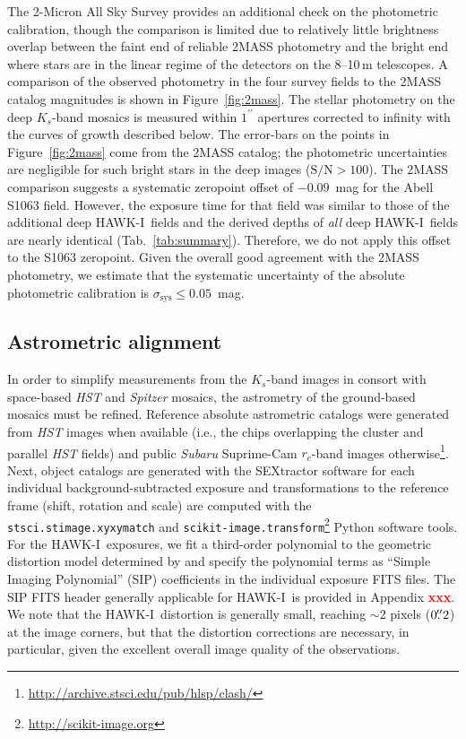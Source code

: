 \documentclass[preprint2]{aastex6}
\gdef\arcsec{^{\prime\prime}}
\newcommand\xxx{{\textcolor{red}{\bf xxx}}}
\gdef\HAWKI{\mbox{HAWK-I}}
\begin{document}
The 2-Micron All Sky Survey \citep[2MASS;][]{2mass} provides an additional check on the photometric calibration, though the comparison is limited due to relatively little brightness overlap between the faint end of reliable 2MASS photometry and the bright end where stars are in the linear regime of the detectors on the 8--10\,m telescopes.  A comparison of the observed photometry in the four survey fields to the 2MASS catalog magnitudes is shown in Figure~\ref{fig:2mass}.  The stellar photometry on the deep $K_s$-band mosaics is measured within $1\arcsec$ apertures corrected to infinity with the curves of growth described below.  The error-bars on the points in Figure~\ref{fig:2mass} come from the 2MASS catalog; the photometric uncertainties are negligible for such bright stars in the deep images ($\mathrm{S/N}>100$).  The 2MASS comparison suggests a systematic zeropoint offset of $-0.09$~mag for the Abell S1063 field.  However, the exposure time for that field was similar to those of the additional deep \HAWKI\ fields and the derived depths of \textit{all} deep \HAWKI\ fields are nearly identical (Tab.~\ref{tab:summary}).  Therefore, we do not apply this offset to the S1063 zeropoint.  Given the overall good agreement with the 2MASS photometry, we estimate that the systematic uncertainty of the absolute photometric calibration is $\sigma_\mathrm{sys}\leq0.05$~mag.

\subsection{Astrometric alignment}
\label{s:astrometry}

In order to simplify measurements from the $K_s$-band images in consort with space-based \textit{HST} and \textit{Spitzer} mosaics, the astrometry of the ground-based mosaics must be refined.  Reference absolute astrometric catalogs were generated from \textit{HST} images when available (i.e., the chips overlapping the cluster and parallel \textit{HST} fields) and public \textit{Subaru} Suprime-Cam $r_c$-band images otherwise\footnote{\url{http://archive.stsci.edu/pub/hlsp/clash/}}.  Next, object catalogs are generated with the SEXtractor software \citep{bertin:96} for each individual background-subtracted exposure and transformations to the reference frame (shift, rotation and scale) are computed with the \texttt{stsci.stimage.xyxymatch} and \texttt{scikit-image.transform}\footnote{\url{http://scikit-image.org}} Python software tools.  For the \HAWKI\ exposures, we fit a third-order polynomial to the geometric distortion model determined by \cite{libralato:14} and specify the polynomial terms as ``Simple Imaging Polynomial'' (SIP) coefficients \citep{fits:sip} in the individual exposure FITS files.  The SIP FITS header generally applicable for \HAWKI\ is provided in Appendix \xxx.  We note that the \HAWKI\ distortion is generally small, reaching $\sim$2 pixels ($0\mbox{$.\!\!^{\prime\prime}$}2$) at the image corners, but that the distortion corrections are necessary, in particular, given the excellent overall image quality of the observations. 
\end{document}
